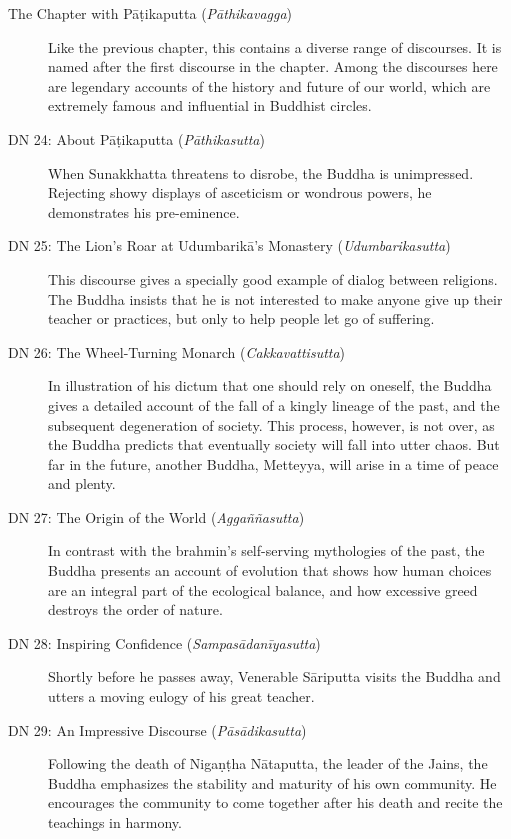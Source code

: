 \documentclass[12pt,openany]{book}%
\begin{document}
\begin{description}%
\item[The Chapter with \textsanskrit{Pāṭikaputta} (\textit{\textsanskrit{Pāthikavagga}})] Like the previous chapter, this contains a diverse range of discourses. It is named after the first discourse in the chapter. Among the discourses here are legendary accounts of the history and future of our world, which are extremely famous and influential in Buddhist circles.%
\item[DN 24: About \textsanskrit{Pāṭikaputta} (\textit{\textsanskrit{Pāthikasutta}})] When Sunakkhatta threatens to disrobe, the Buddha is unimpressed. Rejecting showy displays of asceticism or wondrous powers, he demonstrates his pre-eminence.%
\item[DN 25: The Lion’s Roar at \textsanskrit{Udumbarikā}’s Monastery (\textit{\textsanskrit{Udumbarikasutta}})] This discourse gives a specially good example of dialog between religions. The Buddha insists that he is not interested to make anyone give up their teacher or practices, but only to help people let go of suffering.%
\item[DN 26: The Wheel-Turning Monarch (\textit{\textsanskrit{Cakkavattisutta}})] In illustration of his dictum that one should rely on oneself, the Buddha gives a detailed account of the fall of a kingly lineage of the past, and the subsequent degeneration of society. This process, however, is not over, as the Buddha predicts that eventually society will fall into utter chaos. But far in the future, another Buddha, Metteyya, will arise in a time of peace and plenty.%
\item[DN 27: The Origin of the World (\textit{\textsanskrit{Aggaññasutta}})] In contrast with the brahmin’s self-serving mythologies of the past, the Buddha presents an account of evolution that shows how human choices are an integral part of the ecological balance, and how excessive greed destroys the order of nature.%
\item[DN 28: Inspiring Confidence (\textit{\textsanskrit{Sampasādanīyasutta}})] Shortly before he passes away, Venerable \textsanskrit{Sāriputta} visits the Buddha and utters a moving eulogy of his great teacher.%
\item[DN 29: An Impressive Discourse (\textit{\textsanskrit{Pāsādikasutta}})] Following the death of \textsanskrit{Nigaṇṭha} \textsanskrit{Nātaputta}, the leader of the Jains, the Buddha emphasizes the stability and maturity of his own community. He encourages the community to come together after his death and recite the teachings in harmony.%

\end{description}
\end{document}
